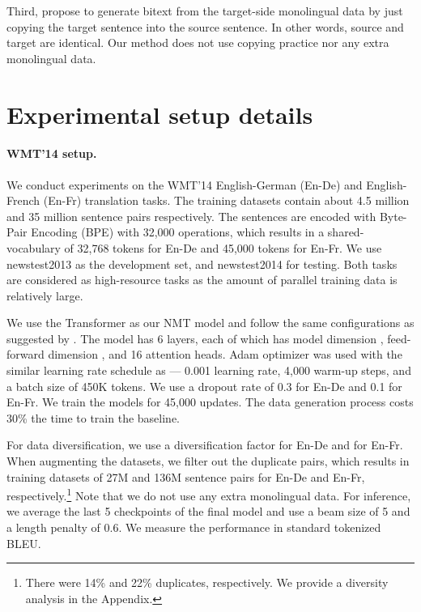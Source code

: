 \documentclass{article}
\begin{document}
Third, \citet{copied-currey-etal-2017} propose to generate bitext from the target-side monolingual data by just copying the target sentence into the source sentence. In other words, source and target are identical. Our method does not use copying practice nor any extra monolingual data.


\section{Experimental setup details} \label{app:setup}

\paragraph{WMT'14 setup.} We conduct experiments on the WMT'14 English-German (En-De) and English-French (En-Fr) translation tasks. The training datasets contain about 4.5 million and 35 million sentence pairs respectively. {The sentences are encoded with Byte-Pair Encoding (BPE) \citep{sennrich2015neural} with 32,000 operations, which results in a shared-vocabulary of 32,768 tokens for En-De and 45,000 tokens for En-Fr.} We use newstest2013 as the development set, and newstest2014 for testing. Both tasks are considered as high-resource tasks as the amount of parallel training data is relatively large. 

We use the Transformer \citep{vaswani2017attention} as our NMT model and follow the same configurations as suggested by \citet{scaling_nmt_ott2018scaling}. The model has 6 layers, each of which has model dimension , feed-forward dimension , and 16 attention heads. 
Adam optimizer \citep{kingma2014adam} was used with the similar learning rate schedule as \citet{scaling_nmt_ott2018scaling} --- 0.001 learning rate, 4,000 warm-up steps, and a batch size of 450K tokens. We use a dropout rate of 0.3 for En-De and 0.1 for En-Fr. We train the models for 45,000 updates. The data generation process costs 30\% the time to train the baseline.

For data diversification, we use a diversification factor  for En-De and  for En-Fr. 
When augmenting the datasets, we filter out the duplicate pairs, which results in training datasets of 27M and 136M sentence pairs for En-De and En-Fr, respectively.\footnote{There were 14\% and 22\% duplicates, respectively. We provide a diversity analysis in the Appendix.} Note that we do {not} use any extra monolingual data. For inference, we average the last 5 checkpoints of the final model and use a beam size of 5 and a length penalty of 0.6. We measure the performance in standard tokenized BLEU.
\end{document}

